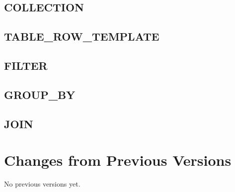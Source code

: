 \documentclass[11pt,a4paper]{ivoa}
\begin{document}
\subsection{COLLECTION}

\subsection{TABLE\_ROW\_TEMPLATE}
\subsection{FILTER}
\subsection{GROUP\_BY}
\subsection{JOIN}




\appendix
\section{Changes from Previous Versions}

No previous versions yet.  



\end{document}
